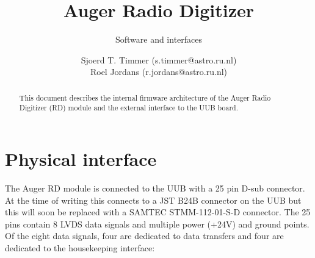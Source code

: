 \documentclass[a4paper,indent]{paper}
\title{Auger Radio Digitizer}
\subtitle{Software and interfaces}
\author{%
  Sjoerd T. Timmer (s.timmer@astro.ru.nl)\\
  Roel Jordans (r.jordans@astro.ru.nl)}
\date{}
\begin{document}
\maketitle{}
\begin{abstract}
  This document describes the internal firmware architecture of the Auger Radio Digitizer (RD) module and the external interface to the UUB board.  
\end{abstract}

\clearpage

\section{Physical interface}
The Auger RD module is connected to the UUB with a 25 pin D-sub connector. At the time of writing this connects to a JST B24B connector on the UUB but this will soon be replaced with a SAMTEC STMM-112-01-S-D connector. The 25 pins contain 8 LVDS data signals and multiple power (+24V) and ground points.
Of the eight data signals, four are dedicated to data transfers and four are dedicated to the housekeeping interface:%
\end{document}
